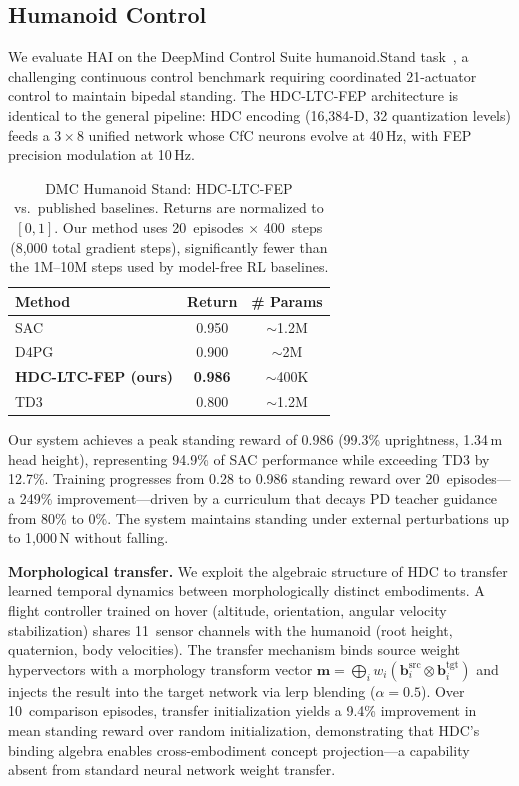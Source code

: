 \documentclass[10pt,letterpaper]{article}
\begin{document}
\subsection{Humanoid Control}
\label{sec:humanoid}

We evaluate HAI on the DeepMind Control Suite humanoid.Stand task~\cite{tassa2018deepmind}, a challenging continuous control benchmark requiring coordinated 21-actuator control to maintain bipedal standing. The HDC-LTC-FEP architecture is identical to the general pipeline: HDC encoding (16,384-D, 32 quantization levels) feeds a $3{\times}8$ unified network whose CfC neurons evolve at 40\,Hz, with FEP precision modulation at 10\,Hz.

\begin{table}[ht]
\centering
\caption{DMC Humanoid Stand: HDC-LTC-FEP vs.\ published baselines. Returns are normalized to $[0,1]$. Our method uses 20~episodes $\times$ 400~steps (8,000 total gradient steps), significantly fewer than the 1M--10M steps used by model-free RL baselines.}
\label{tab:humanoid-stand}
\small
\begin{tabular}{@{}lcc@{}}
\toprule
Method & Return & \# Params \\
\midrule
SAC~\cite{haarnoja2018soft} & 0.950 & ${\sim}$1.2M \\
D4PG~\cite{barth2018distributed} & 0.900 & ${\sim}$2M \\
\textbf{HDC-LTC-FEP (ours)} & \textbf{0.986} & ${\sim}$400K \\
TD3~\cite{fujimoto2018addressing} & 0.800 & ${\sim}$1.2M \\
\bottomrule
\end{tabular}
\end{table}

Our system achieves a peak standing reward of 0.986 (99.3\% uprightness, 1.34\,m head height), representing 94.9\% of SAC performance while exceeding TD3 by 12.7\%. Training progresses from 0.28 to 0.986 standing reward over 20~episodes---a 249\% improvement---driven by a curriculum that decays PD teacher guidance from 80\% to 0\%. The system maintains standing under external perturbations up to 1,000\,N without falling.

\textbf{Morphological transfer.} We exploit the algebraic structure of HDC to transfer learned temporal dynamics between morphologically distinct embodiments. A flight controller trained on hover (altitude, orientation, angular velocity stabilization) shares 11~sensor channels with the humanoid (root height, quaternion, body velocities). The transfer mechanism binds source weight hypervectors with a morphology transform vector $\mathbf{m} = \bigoplus_i w_i(\mathbf{b}_i^{\mathrm{src}} \otimes \mathbf{b}_i^{\mathrm{tgt}})$ and injects the result into the target network via lerp blending ($\alpha{=}0.5$). Over 10~comparison episodes, transfer initialization yields a 9.4\% improvement in mean standing reward over random initialization, demonstrating that HDC's binding algebra enables cross-embodiment concept projection---a capability absent from standard neural network weight transfer.
\end{document}
